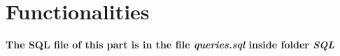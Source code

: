 \newpage
\section{Functionalities}

\textbf{The SQL file of this part is in the file \textit{queries.sql} inside folder \textit{SQL}}
